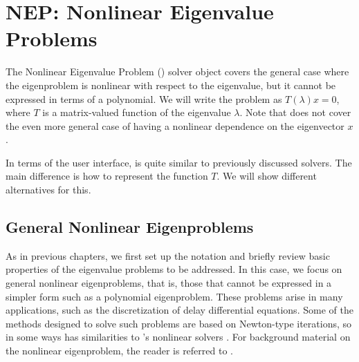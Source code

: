 \chapter{\label{cap:nep}NEP: Nonlinear Eigenvalue Problems}


\noindent The Nonlinear Eigenvalue Problem () solver object covers the general case where the eigenproblem is nonlinear with respect to the eigenvalue, but it cannot be expressed in terms of a polynomial. We will write the problem as $T(\lambda)x=0$, where $T$ is a matrix-valued function of the eigenvalue $\lambda$. Note that  does not cover the even more general case of having a nonlinear dependence on the eigenvector $x$.

In terms of the user interface,  is quite similar to previously discussed solvers. The main difference is how to represent the function $T$. We will show different alternatives for this.

\section{\label{sec:nep}General Nonlinear Eigenproblems}

As in previous chapters, we first set up the notation and briefly review basic properties of the eigenvalue problems to be addressed. In this case, we focus on general nonlinear eigenproblems, that is, those that cannot be expressed in a simpler form such as a polynomial eigenproblem. These problems arise in many applications, such as the discretization of delay differential equations. Some of the methods designed to solve such problems are based on Newton-type iterations, so in some ways  has similarities to \petsc's nonlinear solvers . For background material on the nonlinear eigenproblem, the reader is referred to \citep{Mehrmann:2004:NEP}.

